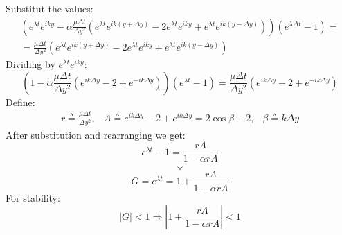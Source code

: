 \documentclass[11pt, a4paper]{article}
\begin{document}
Substitut the values:
\begin{equation}
    \begin{matrix}
        \displaystyle\left(e^{\lambda t}e^{iky} - \alpha\frac{\mu\Delta t}{\Delta y^2}\left(e^{\lambda t}e^{ik\left(y+\Delta y\right)} - 2e^{\lambda t}e^{iky} + e^{\lambda t}e^{ik\left(y-\Delta y\right)}\right)\right)\left(e^{\lambda\Delta t}-1\right) =\\
        \displaystyle= \frac{\mu\Delta t}{\Delta y^2}\left(e^{\lambda t}e^{ik\left(y+\Delta y\right)} - 2e^{\lambda t}e^{iky} + e^{\lambda t}e^{ik\left(y-\Delta y\right)}\right)
    \end{matrix}
\end{equation}
Dividing by $e^{\lambda t}e^{iky}$:
\begin{equation}
    \left(1-\alpha\frac{\mu\Delta t}{\Delta y^2}\left(e^{ik\Delta y} -2 + e^{-ik\Delta y}\right)\right)\left(e^{\lambda t}-1\right) = \frac{\mu\Delta t}{\Delta y^2}\left(e^{ik\Delta y} -2 + e^{-ik\Delta y}\right)
\end{equation}
Define:
\begin{equation}
    \begin{matrix}
        \displaystyle r \triangleq \frac{\mu\Delta t}{\Delta y^2}, &\displaystyle A \triangleq e^{ik\Delta y}-2+e^{ik\Delta y}=2\cos\beta-2, & \displaystyle \beta \triangleq k\Delta y
    \end{matrix}
\end{equation}
\newpage
\noindent After substitution and rearranging we get:
\begin{equation}
    e^{\lambda t}-1 = \frac{rA}{1-\alpha rA}
\end{equation}
$$\Downarrow$$
\begin{equation}
    G = e^{\lambda t} = 1+\frac{rA}{1-\alpha rA}
\end{equation}
For stability:
\begin{equation}
    |G|<1 \Rightarrow \left|1+\frac{rA}{1-\alpha rA}\right| < 1
\end{equation}
\end{document}
